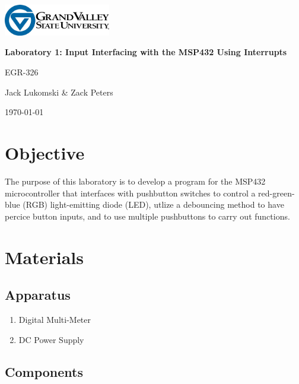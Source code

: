 \documentclass[11pt,a4paper]{article}
\newcommand{\titlestr}{Laboratory 1: Input Interfacing with the MSP432 Using Interrupts}
\newcommand{\authorstr}{Jack Lukomski \& Zack Peters}
\begin{document}
\begin{titlepage}
  \centering
  \includegraphics[width=0.35\textwidth]{images/GVSU.jpg}

  \vspace{1cm}
  {\LARGE \bf{\titlestr} \par}
  
  \vspace{.5cm}
  {\LARGE {EGR-326} \par}

  \vspace{1cm}
  {\Large \authorstr \par}

  \vspace{1cm}
  \today    

  \vfill
\end{titlepage}

\newpage

\tableofcontents
\newpage

\section{Objective}
The purpose of this laboratory is to develop a program for the MSP432 microcontroller that 
interfaces with pushbutton switches to control a red-green-blue (RGB) light-emitting diode (LED),
utlize a debouncing method to have percice button inputs, and to use multiple pushbuttons to carry 
out functions.

\section{Materials}

\subsection{Apparatus}

\begin{enumerate}
  \item Digital Multi-Meter
  \item DC Power Supply
\end{enumerate}

\subsection{Components}
\end{document}
